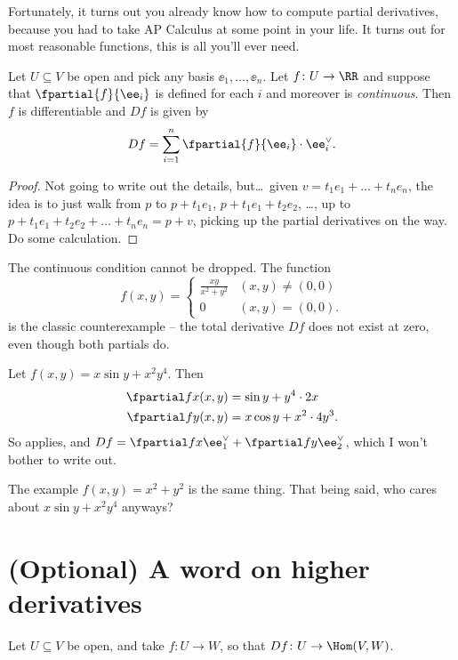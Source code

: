 Fortunately, it turns out you already know how to compute partial derivatives,
because you had to take AP Calculus at some point in your life.
It turns out for most reasonable functions, this is all you'll ever need.
\begin{theorem}
	\label{thm:apcalc_partials}
	Let $U \subseteq V$ be open and pick any basis $\ee_1, \dots, \ee_n$.
	Let $f \colon U \to \RR$ and suppose that $\fpartial{f}{\ee_i}$ is defined
	for each $i$ and moreover is \emph{continuous}.
	Then $f$ is differentiable and $Df$ is given by
	\[ Df = \sum_{i=1}^n \fpartial{f}{\ee_i} \cdot \ee_i^\vee. \]
\end{theorem}
\begin{proof}
	Not going to write out the details, but\dots\
	given $v = t_1e_1 + \dots + t_ne_n$,
	the idea is to just walk from $p$ to $p+t_1e_1$, $p+t_1e_1+t_2e_2$, \dots,
	up to $p+t_1e_1+t_2e_2+\dots+t_ne_n = p+v$,
	picking up the partial derivatives on the way.
	Do some calculation.
\end{proof}

\begin{remark}
	The continuous condition cannot be dropped. The function
	\[
		f(x,y)
		= \begin{cases}
			\frac{xy}{x^2+y^2} & (x,y) \neq (0,0) \\
			0 & (x,y) = (0,0).
		\end{cases}
	\]
	is the classic counterexample -- the total derivative $Df$ does not exist at zero,
	even though both partials do.
\end{remark}

\begin{example}
	Let $f(x,y) = x \sin y + x^2y^4$. Then
	\begin{align*}
		\fpartial fx (x,y) &= \sin y + y^4 \cdot 2x \\
		\fpartial fy (x,y) &= x \cos y + x^2 \cdot 4y^3.
	\end{align*}
	So  applies,
	and $Df = \fpartial fx \ee_1^\vee + \fpartial fy \ee_2^\vee$,
	which I won't bother to write out.
\end{example}

The example $f(x,y) = x^2+y^2$ is the same thing.
That being said, who cares about $x \sin y + x^2y^4$ anyways?

\section{(Optional) A word on higher derivatives}
Let $U \subseteq V$ be open, and take $f \colon U \to W$, so that $Df \colon U \to \Hom(V,W)$.

